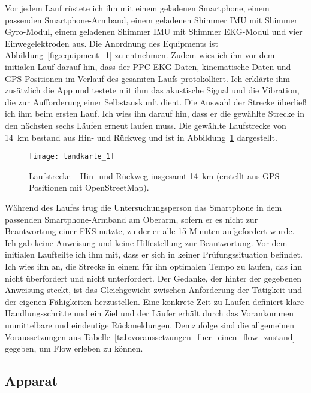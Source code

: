 Vor jedem Lauf rüstete ich ihn mit einem geladenen Smartphone, einem passenden Smartphone-Armband, einem geladenen Shimmer \ac{IMU} mit Shimmer Gyro-Modul, einem geladenen Shimmer \ac{IMU} mit Shimmer EKG-Modul und vier Einwegelektroden aus. Die Anordnung des Equipments ist Abbildung~\ref{fig:equipment_1} zu entnehmen. Zudem wies ich ihn vor dem initialen Lauf darauf hin, dass der \ac{PPC} \ac{EKG}-Daten, kinematische Daten und \ac{GPS}-Positionen im Verlauf des gesamten Laufs protokolliert. Ich erklärte ihm zusätzlich die App und testete mit ihm das akustische Signal und die Vibration, die zur Aufforderung einer Selbstauskunft dient. Die Auswahl der Strecke überließ ich ihm beim ersten Lauf. Ich wies ihn darauf hin, dass er die gewählte Strecke in den nächsten sechs Läufen erneut laufen muss. Die gewählte Laufstrecke von 14~km bestand aus Hin- und Rückweg und ist in Abbildung~\ref{fig:landkarte_1} dargestellt. 
\begin{figure}
	[!htb] \centering 
	\texttt{[image: landkarte\_1]} \caption[Laufstrecke -- Hin- und Rückweg.]{Laufstrecke -- Hin- und Rückweg insgesamt 14~km (erstellt aus GPS-Positionen mit OpenStreetMap).} \label{fig:landkarte_1} 
\end{figure}

Während des Laufes trug die Untersuchungsperson das Smartphone in dem passenden Smartphone-Armband am Oberarm, sofern er es nicht zur Beantwortung einer \ac{FKS} nutzte, zu der er alle 15 Minuten aufgefordert wurde. Ich gab keine Anweisung und keine Hilfestellung zur Beantwortung. Vor dem initialen Laufteilte ich ihm mit, dass er sich in keiner Prüfungssituation befindet. Ich wies ihn an, die Strecke in einem für ihn optimalen Tempo zu laufen, das ihn nicht überfordert und nicht unterfordert. Der Gedanke, der hinter der gegebenen Anweisung steckt, ist das Gleichgewicht zwischen Anforderung der Tätigkeit und der eigenen Fähigkeiten herzustellen. Eine konkrete Zeit zu Laufen definiert klare Handlungsschritte und ein Ziel und der Läufer erhält durch das Vorankommen unmittelbare und eindeutige Rückmeldungen. Demzufolge sind die allgemeinen Voraussetzungen aus Tabelle~\ref{tab:voraussetzungen_fuer_einen_flow_zustand} gegeben, um Flow erleben zu können. 

\subsection{Apparat} 

\label{sub:apparat_5_1}

